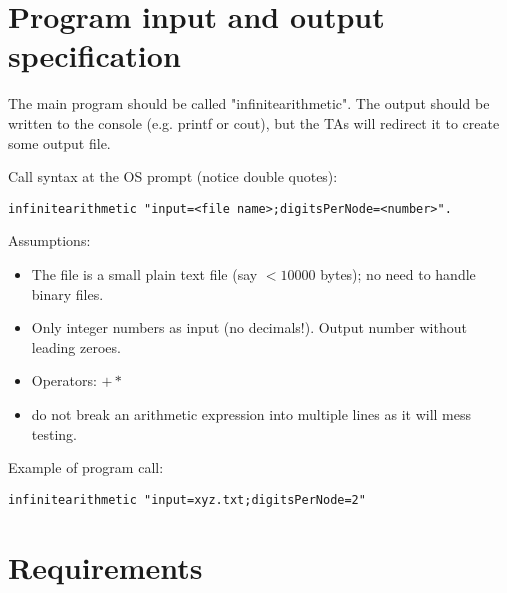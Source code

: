 \section{Program input and output specification}

The main program should be called "infinitearithmetic".
The output should be written to the console (e.g. printf or cout),
but the TAs will redirect it to create some output file.

Call syntax at the OS prompt (notice double quotes):\\
\begin{verbatim}
infinitearithmetic "input=<file name>;digitsPerNode=<number>".
\end{verbatim}

Assumptions:
\begin{itemize}
\item The file is a small plain text file (say $< 10000$ bytes); no need to handle binary files.
\item Only integer numbers as input (no decimals!). Output number without leading zeroes.
\item Operators: $ + * $
\item 
      do not break an arithmetic expression into multiple lines as it will mess testing.
\end{itemize}


Example of program call:
\begin{verbatim}
infinitearithmetic "input=xyz.txt;digitsPerNode=2"
\end{verbatim}



\section{Requirements}

